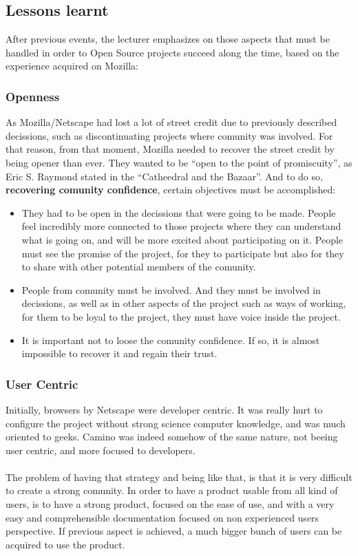 \documentclass[11pt]{article}
\begin{document}
\subsection{Lessons learnt}
After previous events, the lecturer emphasizes on those aspects that must be handled in order to Open Source projects succeed along the time, based on the experience acquired on Mozilla:
\subsubsection{Openness}
As Mozilla/Netscape had lost a lot of street credit due to previously described decissions, such as discontinuating projects where comunity was involved. For that reason, from that moment, Mozilla needed to recover the street credit by being opener than ever. They wanted to be ``open to the point of promiscuity'', as Eric S. Raymond stated in the ``Catheedral and the Bazaar''. And to do so, \textbf{recovering comunity confidence}, certain objectives must be accomplished:
\begin{itemize}\itemsep0pt
\item{They had to be open in the decissions that were going to be made}. People feel incredibly more connected to those projects where they can understand what is going on, and will be more excited about participating on it. People must see the promise of the project, for they to participate but also for they to share with other potential members of the comunity.
\item{People from comunity must be involved}. And they must be involved in decissions, as well as in other aspects of the project such as ways of working, for them to be loyal to the project, they must have voice inside the project.
\item{It is important not to loose the comunity confidence}. If so, it is almost impossible to recover it and regain their trust.
\end{itemize}

\subsubsection{User Centric}
Initially, browsers by Netscape were developer centric. It was really hurt to configure the project without strong science computer knowledge, and was much oriented to geeks. 
Camino was indeed somehow of the same nature, not beeing user centric, and more focused to developers.\\
\\
The problem of having that strategy and being like that, is that it is very difficult to create a strong comunity. In order to have a product usable from all kind of users, is to have a strong product, focused on the ease of use, and with a very easy and comprehensible documentation focused on non experienced users perspective. If previous aspect is achieved, a much bigger bunch of users can be acquired to use the product.
\end{document}
